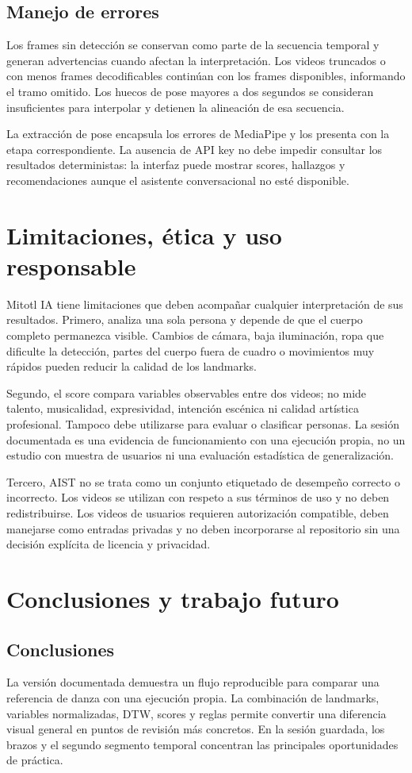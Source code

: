 \documentclass[12pt,a4paper]{article}
\begin{document}
\subsection{Manejo de errores}
Los frames sin detección se conservan como parte de la secuencia temporal y generan advertencias cuando afectan la interpretación. Los videos truncados o con menos frames decodificables continúan con los frames disponibles, informando el tramo omitido. Los huecos de pose mayores a dos segundos se consideran insuficientes para interpolar y detienen la alineación de esa secuencia.

La extracción de pose encapsula los errores de MediaPipe y los presenta con la etapa correspondiente. La ausencia de API key no debe impedir consultar los resultados deterministas: la interfaz puede mostrar scores, hallazgos y recomendaciones aunque el asistente conversacional no esté disponible.

\section{Limitaciones, ética y uso responsable}
Mitotl IA tiene limitaciones que deben acompañar cualquier interpretación de sus resultados. Primero, analiza una sola persona y depende de que el cuerpo completo permanezca visible. Cambios de cámara, baja iluminación, ropa que dificulte la detección, partes del cuerpo fuera de cuadro o movimientos muy rápidos pueden reducir la calidad de los landmarks.

Segundo, el score compara variables observables entre dos videos; no mide talento, musicalidad, expresividad, intención escénica ni calidad artística profesional. Tampoco debe utilizarse para evaluar o clasificar personas. La sesión documentada es una evidencia de funcionamiento con una ejecución propia, no un estudio con muestra de usuarios ni una evaluación estadística de generalización.

Tercero, AIST no se trata como un conjunto etiquetado de desempeño correcto o incorrecto. Los videos se utilizan con respeto a sus términos de uso y no deben redistribuirse. Los videos de usuarios requieren autorización compatible, deben manejarse como entradas privadas y no deben incorporarse al repositorio sin una decisión explícita de licencia y privacidad.

\section{Conclusiones y trabajo futuro}
\subsection{Conclusiones}
La versión documentada demuestra un flujo reproducible para comparar una referencia de danza con una ejecución propia. La combinación de landmarks, variables normalizadas, DTW, scores y reglas permite convertir una diferencia visual general en puntos de revisión más concretos. En la sesión guardada, los brazos y el segundo segmento temporal concentran las principales oportunidades de práctica.
\end{document}
